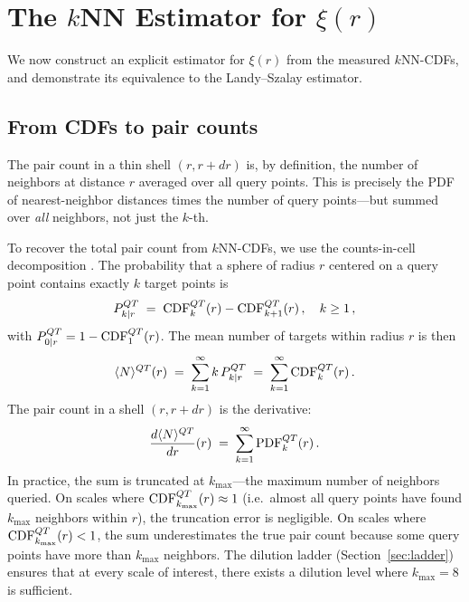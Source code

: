 \section{The $k$NN Estimator for $\xi(r)$}
\label{sec:estimator}

We now construct an explicit estimator for $\xi(r)$ from the measured $k$NN-CDFs, and demonstrate its equivalence to the Landy--Szalay estimator.

\subsection{From CDFs to pair counts}
\label{sec:cdf_to_pairs}

The pair count in a thin shell $(r, r + dr)$ is, by definition, the number of neighbors at distance $r$ averaged over all query points.  This is precisely the PDF of nearest-neighbor distances times the number of query points---but summed over \emph{all} neighbors, not just the $k$-th.

To recover the total pair count from $k$NN-CDFs, we use the counts-in-cell decomposition \citep{Banerjee2020}.  The probability that a sphere of radius $r$ centered on a query point contains exactly $k$ target points is
\begin{equation}
  P_{k|r}^{QT} \;=\; \mathrm{CDF}^{QT}_k(r) - \mathrm{CDF}^{QT}_{k+1}(r)\,,\quad k \geq 1\,,
  \label{eq:Pk_from_CDF}
\end{equation}
with $P_{0|r}^{QT} = 1 - \mathrm{CDF}^{QT}_1(r)$.  The mean number of targets within radius $r$ is then
\begin{equation}
  \langle N \rangle^{QT}(r) \;=\; \sum_{k=1}^{\infty} k\,P_{k|r}^{QT} \;=\; \sum_{k=1}^{\infty} \mathrm{CDF}^{QT}_k(r)\,.
  \label{eq:mean_count}
\end{equation}
The pair count in a shell $(r, r+dr)$ is the derivative:
\begin{equation}
  \frac{d\langle N\rangle^{QT}}{dr}(r) \;=\; \sum_{k=1}^{\infty} \mathrm{PDF}^{QT}_k(r)\,.
  \label{eq:pair_count_from_pdf}
\end{equation}
In practice, the sum is truncated at $k_{\max}$---the maximum number of neighbors queried.  On scales where $\mathrm{CDF}^{QT}_{k_{\max}}(r) \approx 1$ (i.e.\ almost all query points have found $k_{\max}$ neighbors within $r$), the truncation error is negligible.  On scales where $\mathrm{CDF}^{QT}_{k_{\max}}(r) < 1$, the sum underestimates the true pair count because some query points have more than $k_{\max}$ neighbors.  The dilution ladder (Section~\ref{sec:ladder}) ensures that at every scale of interest, there exists a dilution level where $k_{\max} = 8$ is sufficient.

